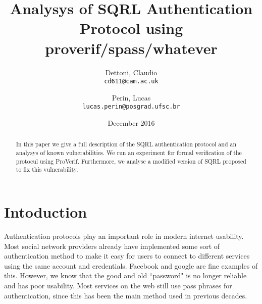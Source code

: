\documentclass{article}
\title{Analysys of SQRL Authentication Protocol using proverif/spass/whatever}
\author{Dettoni, Claudio\\
	\texttt{cd611@cam.ac.uk}
	\and
	Perin, Lucas\\
	\texttt{lucas.perin@posgrad.ufsc.br}
}
\date{December 2016}
\begin{document}
\maketitle

\begin{abstract}
	In this paper we give a full description of the SQRL authentication
	protocol and an analysys of known vulnerabilities. We run an 
	experiment for formal verification of the protocul using ProVerif.
	Furthermore, we analyse a modified version of SQRL proposed to fix
	this vulnerability.
\end{abstract}

\section{Intoduction}
	Authentication protocols play an important role in modern internet
	usability. Most social network providers already have implemented
	some sort of authentication method to make it easy for users to connect
	to different services using the same account and credentials. Facebook
	and google are fine examples of this. However, we know that the good and 
	old ``password" is no longer reliable and has poor usability. 
	Most services on the web still use pass phrases for authentication,
	since this has been the main method used in previous decades.
\end{document}
